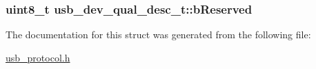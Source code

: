 \label{structusb__dev__qual__desc__t_abc20c54ce8c80873029d9b4a3579ea4b}
\hypertarget{structusb__dev__qual__desc__t_acd51487e6ef5f7c93f5e9752963b9e26}{
\subsubsection[{b\-Reserved}]{\setlength{\rightskip}{0pt plus 5cm}uint8\-\_\-t {\bf usb\-\_\-dev\-\_\-qual\-\_\-desc\-\_\-t\-::b\-Reserved}}}
\label{structusb__dev__qual__desc__t_acd51487e6ef5f7c93f5e9752963b9e26}


\-The documentation for this struct was generated from the following file\-:\begin{DoxyCompactItemize}
\item 
\hyperlink{usb__protocol_8h}{usb\-\_\-protocol.\-h}\end{DoxyCompactItemize}
